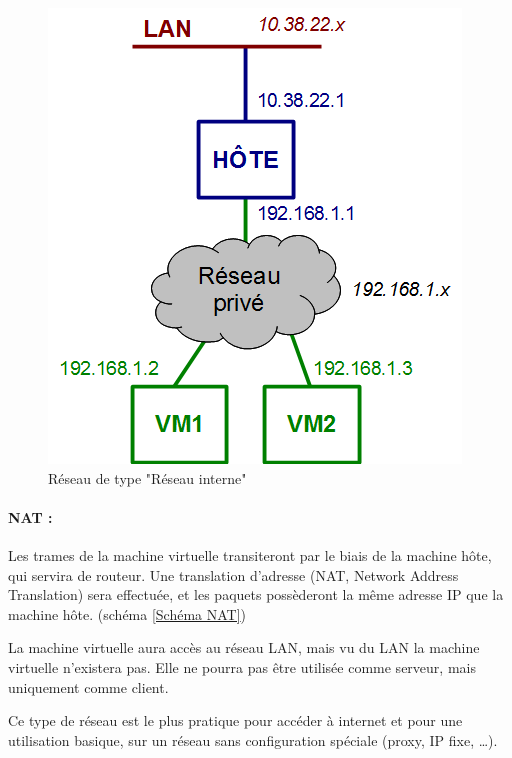 \begin{figure}[H]
	\center
	\includegraphics[scale=0.5]{img/types_reseau/Reseau_interne.png}
	\caption{Réseau de type "Réseau interne"}
	\label{Schéma Réseau interne}
\end{figure}


\paragraph{NAT :}

Les trames de la machine virtuelle transiteront par le biais de la machine hôte, qui servira de routeur.
Une translation d'adresse (NAT, Network Address Translation) sera effectuée, et les paquets possèderont la même adresse IP que la machine hôte. (schéma \ref{Schéma NAT})

La machine virtuelle aura accès au réseau LAN, mais vu du LAN la machine virtuelle n'existera pas.
Elle ne pourra pas être utilisée comme serveur, mais uniquement comme client.

Ce type de réseau est le plus pratique pour accéder à internet et pour une utilisation basique, sur un réseau sans configuration spéciale (proxy, IP fixe, \ldots).

